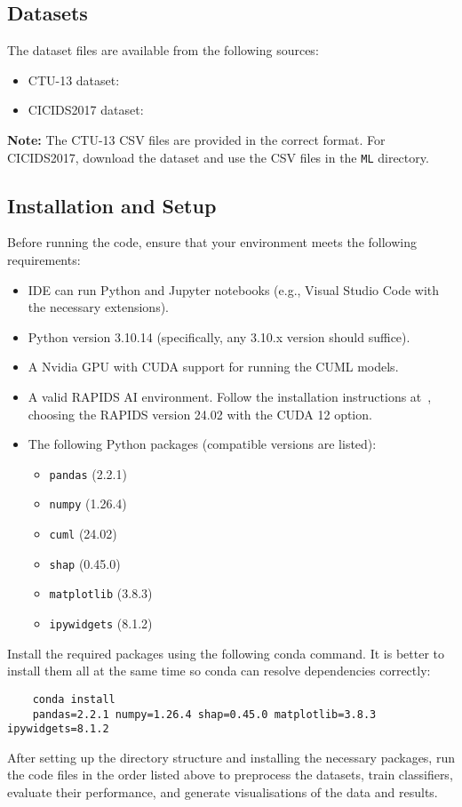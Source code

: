 \subsection{Datasets}

The dataset files are available from the following sources:

\begin{itemize}
    \item CTU-13 dataset:~\cite{CTU13download}
    \item CICIDS2017 dataset:~\cite{CICIDS2017download}
\end{itemize}

\textbf{Note:} The CTU-13 CSV files are provided in the correct format. For CICIDS2017, download the dataset and use the CSV files in the \texttt{ML} directory.

\subsection{Installation and Setup}

Before running the code, ensure that your environment meets the following requirements:

\begin{itemize}
    \item IDE can run Python and Jupyter notebooks (e.g., Visual Studio Code with the necessary extensions).
    \item Python version 3.10.14 (specifically, any 3.10.x version should suffice).
    \item A Nvidia GPU with CUDA support for running the CUML models.
    \item A valid RAPIDS AI environment. 
    Follow the installation instructions at~\cite{RAPIDSdownload}, choosing the RAPIDS version 24.02 with the CUDA 12 option.
    \item The following Python packages (compatible versions are listed):
    \begin{itemize}
        \item \texttt{pandas} (2.2.1)
        \item \texttt{numpy} (1.26.4)
        \item \texttt{cuml} (24.02)
        \item \texttt{shap} (0.45.0)
        \item \texttt{matplotlib} (3.8.3)
        \item \texttt{ipywidgets} (8.1.2)
    \end{itemize}
\end{itemize}

Install the required packages using the following conda command. It is better to install them all at the same time so conda can resolve dependencies correctly:

\begin{verbatim}
    conda install 
    pandas=2.2.1 numpy=1.26.4 shap=0.45.0 matplotlib=3.8.3 ipywidgets=8.1.2
\end{verbatim}

After setting up the directory structure and installing the necessary packages, run the code files in the order listed above to preprocess the datasets, train classifiers, evaluate their performance, and generate visualisations of the data and results.